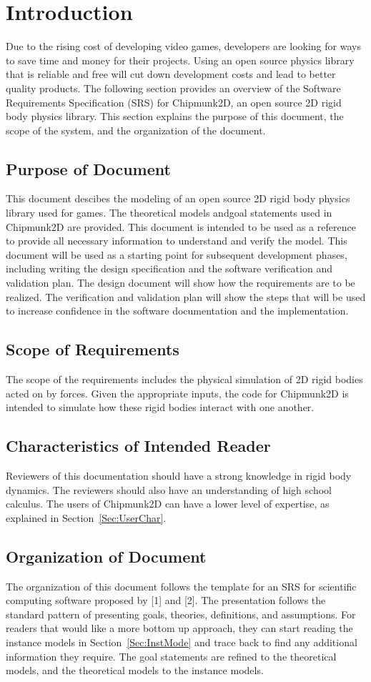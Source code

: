 \documentclass[12pt]{article}
\begin{document}
\section{Introduction}
\label{Sec:Intr}
Due to the rising cost of developing video games, developers are looking for ways to save time and money for their projects. Using an open source physics library that is reliable and free will cut down development costs and lead to better quality products.
The following section provides an overview of the Software Requirements Specification (SRS) for Chipmunk2D, an open source 2D rigid body physics library. This section explains the purpose of this document, the scope of the system, and the organization of the document.
\subsection{Purpose of Document}
\label{Sec:PurpofDocu}
This document descibes the modeling of an open source 2D rigid body physics library used for games. The theoretical models andgoal statements used in Chipmunk2D are provided. This document is intended to be used as a reference to provide all necessary information to understand and verify the model.
This document will be used as a starting point for subsequent development phases, including writing the design specification and the software verification and validation plan. The design document will show how the requirements are to be realized. The verification and validation plan will show the steps that will be used to increase confidence in the software documentation and the implementation.
\subsection{Scope of Requirements}
\label{Sec:ScopofRequ}
The scope of the requirements includes the physical simulation of 2D rigid bodies acted on by forces. Given the appropriate inputs, the code for Chipmunk2D is intended to simulate how these rigid bodies interact with one another.
\subsection{Characteristics of Intended Reader}
\label{Sec:CharofInteRead}
Reviewers of this documentation should have a strong knowledge in rigid body dynamics. The reviewers should also have an understanding of high school calculus. The users of Chipmunk2D can have a lower level of expertise, as explained in Section~\ref{Sec:UserChar}.
\subsection{Organization of Document}
\label{Sec:OrgaofDocu}
The organization of this document follows the template for an SRS for scientific computing software proposed by [1] and [2]. The presentation follows the standard pattern of presenting goals, theories, definitions, and assumptions. For readers that would like a more bottom up approach, they can start reading the instance models in Section~\ref{Sec:InstMode} and trace back to find any additional information they require.
The goal statements are refined to the theoretical models, and the theoretical models to the instance models.
\end{document}
